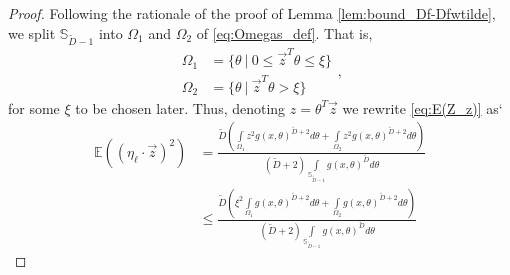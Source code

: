 \documentclass[12pt]{article}
\theoremstyle{remark}
\newcommand{\EE}{\mathbb{E}}
\newcommand{\wtilde}[1]{\widetilde{#1}}
\begin{document}
\begin{appendices}
\begin{proof}
Following the rationale of the proof of Lemma \ref{lem:bound_Df-Dfwtilde}, we split $\mathbb{S}_{\wtilde D-1}$ into $\Omega_1$ and $\Omega_2$ of \eqref{eq:Omegas_def}.
That is,
\begin{equation*}
    \begin{aligned}
    \Omega_1 &= \{\theta~|~0\leq \vec{z}^T\theta \leq \xi\}\\
    \Omega_2 &= \{\theta~|~\vec{z}^T\theta > \xi\}
    \end{aligned}
,\end{equation*}
for some $\xi$ to be chosen later.
Thus, denoting $z = \theta^T \vec{z}$ we rewrite \eqref{eq:E(Z_z)} as` 
\begin{align*}
\EE((\eta_\ell\cdot \vec{z})^2)   &=\frac{\wtilde D\left(\int\limits_{\Omega_1}z^2 g(x,\theta)^{\wtilde D+2} d\theta + \int\limits_{\Omega_2}z^2 g(x,\theta)^{\wtilde D+2} d\theta\right)}{(\wtilde D+2)\int\limits_{\mathbb{S}_{\wtilde D-1}}g(x,\theta)^{\wtilde D} d\theta} 
\\
&\leq  \frac{\wtilde D\left(\xi^2 \int\limits_{\Omega_1} g(x,\theta)^{\wtilde D+2} d\theta + \int\limits_{\Omega_2} g(x,\theta)^{\wtilde D+2} d\theta\right)}{(\wtilde D+2)\int\limits_{\mathbb{S}_{\wtilde D-1}}g(x,\theta)^{\wtilde D} d\theta} 
\end{align*}


\end{proof}
\end{appendices}
\end{document}
